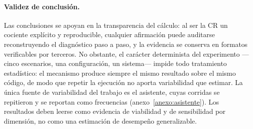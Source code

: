 \paragraph{Validez de conclusión.} Las conclusiones se apoyan en la transparencia del cálculo: al ser la CR un cociente explícito y reproducible, cualquier afirmación puede auditarse reconstruyendo el diagnóstico paso a paso, y la evidencia se conserva en formatos verificables por terceros. No obstante, el carácter determinista del experimento ---cinco escenarios, una configuración, un sistema--- impide todo tratamiento estadístico: el mecanismo produce siempre el mismo resultado sobre el mismo código, de modo que repetir la ejecución no aporta variabilidad que estimar. La única fuente de variabilidad del trabajo es el asistente, cuyas corridas se repitieron y se reportan como frecuencias (anexo~\ref{anexo:asistente}). Los resultados deben leerse como evidencia de viabilidad y de sensibilidad por dimensión, no como una estimación de desempeño generalizable.

